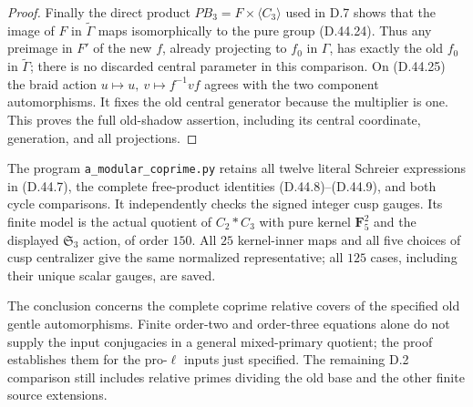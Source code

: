 \begin{proof}
Finally the direct product
\(PB_3=F\times\langle C_3\rangle\)
used in D.7 shows that
the image of \(F\) in
\(\widetilde\Gamma\) maps
isomorphically to the
pure group
\textup{(D.44.24)}.
Thus any preimage in \(F'\)
of the new \(f\), already
projecting to \(f_0\) in
\(\Gamma\), has exactly
the old \(f_0\) in
\(\widetilde\Gamma\);
there is no discarded
central parameter in
this comparison.
On \textup{(D.44.25)}
the braid action
\(u\mapsto u,\ v\mapsto f^{-1}vf\)
agrees with the two
component automorphisms.
It fixes the old central
generator because the
multiplier is one.
This proves the full
old-shadow assertion,
including its central
coordinate, generation,
and all projections.
\end{proof}

The program
\texttt{a\_modular\_coprime.py}
retains all twelve literal
Schreier expressions in
\textup{(D.44.7)}, the
complete free-product
identities
\textup{(D.44.8)--(D.44.9)},
and both cycle comparisons.
It independently checks
the signed integer cusp
gauges.
Its finite model is the
actual quotient of
\(C_2*C_3\) with pure
kernel \(\mathbf F_5^2\)
and the displayed
\(\mathfrak S_3\) action,
of order \(150\).
All \(25\) kernel-inner
maps and all five choices
of cusp centralizer
give the same normalized
representative; all
\(125\) cases, including
their unique scalar
gauges, are saved.

The conclusion concerns
the complete coprime
relative covers of the
specified old gentle
automorphisms.
Finite order-two and
order-three equations
alone do not supply the
input conjugacies in a
general mixed-primary
quotient; the proof
establishes them for
the pro-\(\ell\) inputs
just specified.
The remaining D.2
comparison still includes
relative primes dividing
the old base and the
other finite source
extensions.
